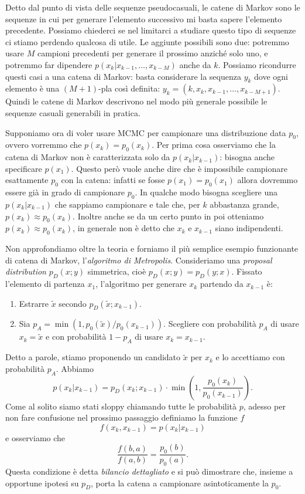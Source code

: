 Detto dal punto di vista delle sequenze pseudocasuali, le catene di Markov sono
le sequenze in cui per generare l'elemento successivo mi basta sapere
l'elemento precedente. Possiamo chiederci se nel limitarci a studiare questo
tipo di sequenze ci stiamo perdendo qualcosa di utile. Le aggiunte possibili
sono due: potremmo usare $M$ campioni precedenti per generare il prossimo
anziché solo uno, e potremmo far dipendere $p(x_k|x_{k-1},\dots,x_{k-M})$ anche
da $k$. Possiamo ricondurre questi casi a una catena di Markov: basta
considerare la sequenza $y_k$ dove ogni elemento è una $(M+1)$-pla così
definita: $y_k = (k, x_k, x_{k-1}, \dots, x_{k-M+1})$. Quindi le catene di
Markov descrivono nel modo più generale possibile le sequenze casuali
generabili in pratica.

Supponiamo ora di voler usare MCMC per campionare una distribuzione data $p_0$,
ovvero vorremmo che $p(x_k) = p_0(x_k)$. Per prima cosa osserviamo che la
catena di Markov non è caratterizzata solo da $p(x_k|x_{k-1})$: bisogna anche
specificare $p(x_1)$. Questo però vuole anche dire che è impossibile campionare
esattamente $p_0$ con la catena: infatti se fosse $p(x_1) = p_0(x_1)$ allora
dovremmo essere già in grado di campionare $p_0$. In qualche modo bisogna
scegliere una $p(x_k|x_{k-1})$ che sappiamo campionare e tale che, per $k$
abbastanza grande, $p(x_k) \approx p_0(x_k)$. Inoltre anche se da un certo punto
in poi otteniamo $p(x_k) \approx p_0(x_k)$, in generale non è detto che
$x_k$ e $x_{k-1}$ siano indipendenti.

Non approfondiamo oltre la teoria e forniamo il più semplice esempio
funzionante di catena di Markov, l'\emph{algoritmo di Metropolis}. Consideriamo
una \emph{proposal distribution} $p_D(x;y)$ simmetrica, cioè $p_D(x;y) =
p_D(y;x)$. Fissato l'elemento di partenza $x_1$, l'algoritmo per generare
$x_k$ partendo da $x_{k-1}$ è:
\begin{enumerate}
    \item Estrarre $\tilde x$ secondo $p_D(\tilde x;x_{k-1})$.
    \item Sia $p_A = \min(1, p_0(\tilde x)/p_0(x_{k-1}))$. Scegliere con
    probabilità $p_A$ di usare $x_k = \tilde x$ e con probabilità $1-p_A$
    di usare $x_k = x_{k-1}$.
\end{enumerate}
Detto a parole, stiamo proponendo un candidato $\tilde x$ per $x_k$ e
lo accettiamo con probabilità $p_A$. Abbiamo
\begin{equation}
	p(x_k|x_{k-1})
	= p_D(x_k;x_{k-1}) \cdot \min\left(1,\frac{p_0(x_k)}{p_0(x_{k-1})}\right).
\end{equation}
Come al solito siamo stati sloppy chiamando tutte le probabilità $p$, adesso per
non fare confusione nel prossimo passaggio definiamo la funzione $f$
\begin{equation}
    f(x_k, x_{k-1}) = p(x_k|x_{k-1})
\end{equation}
e osserviamo che
\begin{equation}
    \label{eq:db}
    \frac {f(b, a)} {f(a, b)} = \frac {p_0(b)} {p_0(a)}.
\end{equation}
Questa condizione è detta \emph{bilancio dettagliato} e si può dimostrare che,
insieme a opportune ipotesi su $p_D$, porta la catena a campionare
asintoticamente la $p_0$.

